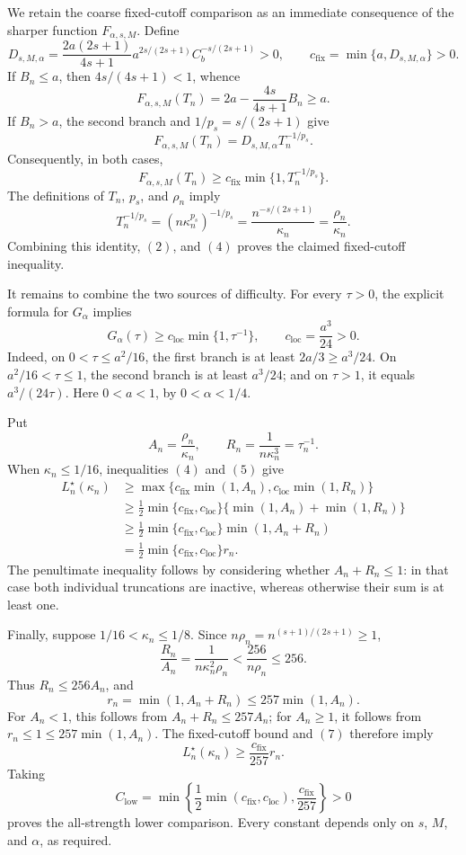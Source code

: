 We retain the coarse fixed-cutoff comparison as an immediate consequence
of the sharper function \(F_{\alpha,s,M}\).  Define
\[
 D_{s,M,\alpha}
 =\frac{2a(2s+1)}{4s+1}
   a^{2s/(2s+1)}C_b^{-s/(2s+1)}>0,
 \qquad
 c_{\mathrm{fix}}=\min\{a,D_{s,M,\alpha}\}>0.
\]
If \(B_n\le a\), then \(4s/(4s+1)<1\), whence
\[
 F_{\alpha,s,M}(T_n)
 =2a-\frac{4s}{4s+1}B_n\ge a.
\]
If \(B_n>a\), the second branch and
\(1/p_s=s/(2s+1)\) give
\[
 F_{\alpha,s,M}(T_n)
 =D_{s,M,\alpha}T_n^{-1/p_s}.
\]
Consequently, in both cases,
\[
 F_{\alpha,s,M}(T_n)
 \ge c_{\mathrm{fix}}\min\{1,T_n^{-1/p_s}\}.
 \tag{4}
\]
The definitions of \(T_n\), \(p_s\), and \(\rho_n\) imply
\[
 T_n^{-1/p_s}
 =(n\kappa_n^{p_s})^{-1/p_s}
 =\frac{n^{-s/(2s+1)}}{\kappa_n}
 =\frac{\rho_n}{\kappa_n}.
\]
Combining this identity, \((2)\), and \((4)\) proves the claimed
fixed-cutoff inequality.

It remains to combine the two sources of difficulty.  For every
\(\tau>0\), the explicit formula for \(G_\alpha\) implies
\[
 G_\alpha(\tau)\ge c_{\mathrm{loc}}\min\{1,\tau^{-1}\},
 \qquad c_{\mathrm{loc}}=\frac{a^3}{24}>0.
 \tag{5}
\]
Indeed, on \(0<\tau\le a^2/16\), the first branch is at least
\(2a/3\ge a^3/24\).  On \(a^2/16<\tau\le1\), the second branch is at
least \(a^3/24\); and on \(\tau>1\), it equals
\(a^3/(24\tau)\).  Here \(0<a<1\), by \(0<\alpha<1/4\).

Put
\[
 A_n=\frac{\rho_n}{\kappa_n},
 \qquad R_n=\frac1{n\kappa_n^3}=\tau_n^{-1}.
\]
When \(\kappa_n\le1/16\), inequalities \((4)\) and \((5)\) give
\[
 \begin{aligned}
 L_n^\star(\kappa_n)
 &\ge\max\{c_{\mathrm{fix}}\min(1,A_n),
              c_{\mathrm{loc}}\min(1,R_n)\}\\
 &\ge\frac12\min\{c_{\mathrm{fix}},c_{\mathrm{loc}}\}
       \{\min(1,A_n)+\min(1,R_n)\}\\
 &\ge\frac12\min\{c_{\mathrm{fix}},c_{\mathrm{loc}}\}
       \min(1,A_n+R_n)\\
 &=\frac12\min\{c_{\mathrm{fix}},c_{\mathrm{loc}}\}r_n.
 \tag{6}
 \end{aligned}
\]
The penultimate inequality follows by considering whether
\(A_n+R_n\le1\): in that case both individual truncations are inactive,
whereas otherwise their sum is at least one.

Finally, suppose \(1/16<\kappa_n\le1/8\).  Since
\(n\rho_n=n^{(s+1)/(2s+1)}\ge1\),
\[
 \frac{R_n}{A_n}
 =\frac1{n\kappa_n^2\rho_n}
 <\frac{256}{n\rho_n}
 \le256.
\]
Thus \(R_n\le256A_n\), and
\[
 r_n=\min(1,A_n+R_n)\le257\min(1,A_n).
 \tag{7}
\]
For \(A_n<1\), this follows from
\(A_n+R_n\le257A_n\); for \(A_n\ge1\), it follows from
\(r_n\le1\le257\min(1,A_n)\).  The fixed-cutoff bound and \((7)\)
therefore imply
\[
 L_n^\star(\kappa_n)\ge\frac{c_{\mathrm{fix}}}{257}r_n.
\]
Taking
\[
 C_{\mathrm{low}}
 =\min\left\{
 \frac12\min(c_{\mathrm{fix}},c_{\mathrm{loc}}),
 \frac{c_{\mathrm{fix}}}{257}
 \right\}>0
\]
proves the all-strength lower comparison.  Every constant depends only
on \(s\), \(M\), and \(\alpha\), as required.
